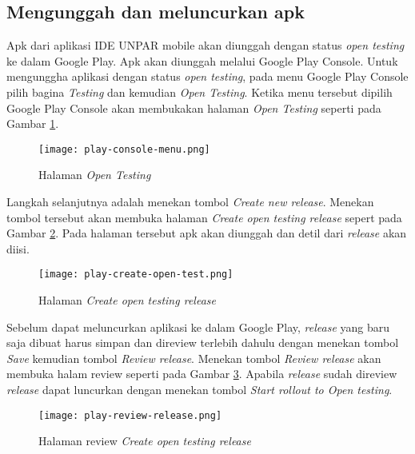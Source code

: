 \subsection{Mengunggah dan meluncurkan apk}
Apk dari aplikasi IDE UNPAR mobile akan diunggah dengan status \textit{open testing} ke dalam Google Play. Apk akan diunggah melalui Google Play Console. Untuk mengunggha aplikasi dengan status \textit{open testing}, pada menu Google Play Console pilih bagina \textit{Testing} dan kemudian \textit{Open Testing}. Ketika menu tersebut dipilih Google Play Console akan membukakan halaman \textit{Open Testing} seperti pada Gambar \ref{fig:play:open:test}. 

\begin{figure}[H] 
	\centering  
	\texttt{[image: play-console-menu.png]}  
	\caption[Halaman \textit{Open Testing}] {Halaman \textit{Open Testing}} 
	\label{fig:play:open:test} 
\end{figure} 

Langkah selanjutnya adalah menekan tombol \textit{Create new release}. Menekan tombol tersebut akan membuka halaman \textit{Create open testing release} sepert pada Gambar \ref{fig:play:open:test:create}. Pada halaman tersebut apk akan diunggah dan detil dari \textit{release} akan diisi.  

\begin{figure}[H] 
	\centering  
	\texttt{[image: play-create-open-test.png]}  
	\caption[Halaman \textit{Create open testing release}] {Halaman \textit{Create open testing release}} 
	\label{fig:play:open:test:create} 
\end{figure} 

Sebelum dapat meluncurkan aplikasi ke dalam Google Play, \textit{release} yang baru saja dibuat harus simpan dan direview terlebih dahulu dengan menekan tombol \textit{Save} kemudian tombol \textit{Review release}. Menekan tombol \textit{Review release} akan membuka halam review seperti pada Gambar \ref{fig:play:open:test:review}. Apabila \textit{release} sudah direview \textit{release} dapat luncurkan dengan menekan tombol \textit{Start rollout to Open testing}.

\begin{figure}[H] 
	\centering  
	\texttt{[image: play-review-release.png]}  
	\caption[Halaman review \textit{Create open testing release}] {Halaman review \textit{Create open testing release}} 
	\label{fig:play:open:test:review} 
\end{figure} 